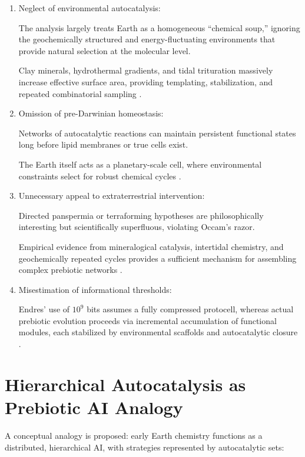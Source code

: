 \documentclass{book}
\begin{document}
\begin{enumerate}
\item Neglect of environmental autocatalysis:

The analysis largely treats Earth as a homogeneous “chemical soup,” ignoring the geochemically structured and energy-fluctuating environments that provide natural selection at the molecular level.

Clay minerals, hydrothermal gradients, and tidal trituration massively increase effective surface area, providing templating, stabilization, and repeated combinatorial sampling \citep{hazen2005, barge2022}.

\item Omission of pre-Darwinian homeostasis:

Networks of autocatalytic reactions can maintain persistent functional states long before lipid membranes or true cells exist.

The Earth itself acts as a planetary-scale cell, where environmental constraints select for robust chemical cycles \citep{peng2022}.

\item Unnecessary appeal to extraterrestrial intervention:

Directed panspermia or terraforming hypotheses are philosophically interesting but scientifically superfluous, violating Occam’s razor.

Empirical evidence from mineralogical catalysis, intertidal chemistry, and geochemically repeated cycles provides a sufficient mechanism for assembling complex prebiotic networks \citep{gan2024}.

\item Misestimation of informational thresholds:

Endres’ use of $10^9$ bits assumes a fully compressed protocell, whereas actual prebiotic evolution proceeds via incremental accumulation of functional modules, each stabilized by environmental scaffolds and autocatalytic closure \citep{plum2025}.
\end{enumerate}

\section{Hierarchical Autocatalysis as Prebiotic AI Analogy}
A conceptual analogy is proposed: early Earth chemistry functions as a distributed, hierarchical AI, with strategies represented by autocatalytic sets:
\end{document}

